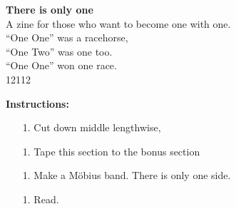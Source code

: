 \setcounter{section}{0}

\begin{center}
  {\Large \textbf{There is only one}}\\
A zine for those who want to become one with one.\\
\vspace{0.2cm}
  \enquote{One One} was a racehorse, \\
  \enquote{One Two} was one too.\\
  \enquote{One One} won one race.\\
  12112
\end{center}
\textbf{Instructions:}
\begin{enumerate}
  \item[1.] Cut down middle lengthwise, 
  \item[1.] Tape this section to the bonus section
  \item[1.] Make a M\"{o}bius band. There is only one side.
  \item[1.] Read.
\end{enumerate}

